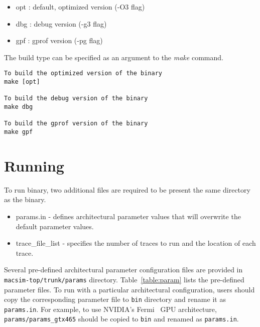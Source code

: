\begin{itemize}
  \item opt : default, optimized version (-O3 flag)
  \item dbg : debug version (-g3 flag)
  \item gpf : gprof version (-pg flag)
\end{itemize}

\noindent
The build type can be specified as an argument to the \textit{make} command.

\begin{Verbatim}
To build the optimized version of the binary
make [opt] 

To build the debug version of the binary
make dbg

To build the gprof version of the binary
make gpf
\end{Verbatim}





\section{Running \SIM}
\label{sec:run}

To run \bin binary, two additional files are required to be present 
the same directory as the binary.

\begin{itemize}
  \item params.in - defines architectural parameter values that will
  overwrite the default parameter values.

  \item trace\_file\_list - specifies the number of traces to run and
  the location of each trace.
\end{itemize}


Several pre-defined architectural parameter configuration files are provided in
\Verb+macsim-top/trunk/params+ directory. Table~\ref{table:param} lists the
pre-defined parameter files. To run \SIM with a particular architectural
configuration, users should copy the corresponding parameter file to \Verb+bin+
directory and rename it as \Verb+params.in+. For example, to use NVIDIA's
Fermi~\cite{fermi} GPU architecture, \Verb+params/params_gtx465+ should be
copied to \Verb+bin+ and renamed as \Verb+params.in+. 



